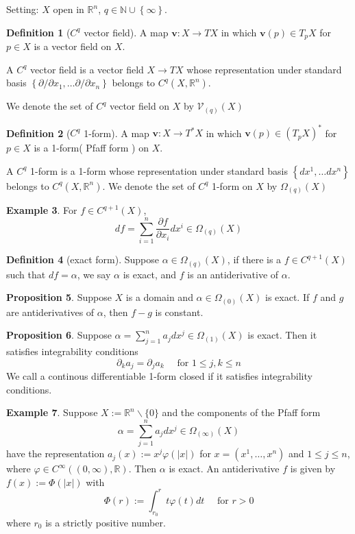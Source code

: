 \documentclass[12pt,a4paper]{book}
\newcommand{\bbrace}[1]{\left\{ #1 \right\} }
\newcommand{\bb}[1]{\mathbb{#1}}
\theoremstyle{definition}
\newtheorem{defn}{Definition}[section]
\newtheorem{prop}[defn]{Proposition}
\newtheorem{exam}[defn]{Example}
\begin{document}
Setting: $X$ open in $\bb{R}^n$, $q\in\bb{N}\cup\bbrace{\infty}$. 
\begin{defn}[$C^q$ vector field]
    A map $\boldsymbol{v}: X \rightarrow T X$ in which $\boldsymbol{v}(p) \in T_p X$ for $p \in X$ is a vector field on $X$.
    
    A $C^q$ vector field is a vector field $X\rightarrow TX$ whose
    representation under standard basis 
    $\bbrace{\partial/\partial x_1,\dots \partial/\partial x_n}$ 
    belongs to $C^q(X,\bb{R}^n)$. 

    We denote the set of $C^q$ vector field on $X$ by $\mathcal{V}_{(q)}(X)$

\end{defn}
\begin{defn}[$C^q$ 1-form]
    A map $\boldsymbol{v}: X \rightarrow T^* X$ in which 
    $\boldsymbol{v}(p) \in (T_pX)^* $ 
    for $p \in X$ is a 1-form( Pfaff form ) on $X$.
    
    A $C^q$ 1-form is a 1-form whose
    representation under standard basis 
    $\bbrace{dx^1,\dots dx^n}$ 
    belongs to $C^q(X,\bb{R}^n)$. 
    We denote the set of $C^q$ 1-form on $X$ by $\Omega_{(q)}(X)$

\end{defn}
\begin{exam}
    For $f\in C^{q+1}(X)$, 
    \begin{equation*}
        df=\sum_{i=1}^n \frac{\partial f}{\partial x_i} dx^i\in \Omega_{(q)}(X) 
    \end{equation*}
\end{exam}
\begin{defn}[exact form]
    Suppose $\alpha \in \Omega_{(q)}(X)$, 
    if there is a $f \in C^{q+1}(X)$ such that $d f=\alpha$, we say $\alpha$ is exact, and $f$ is an antiderivative of $\alpha$.    
\end{defn}
\begin{prop}
    Suppose $X$ is a domain and $\alpha \in \Omega_{(0)}(X)$ is exact. If $f$ and $g$ are antiderivatives of $\alpha$, then $f-g$ is constant.
\end{prop}
\begin{prop}
    Suppose $\alpha=\sum_{j=1}^n a_j d x^j \in \Omega_{(1)}(X)$ is exact. Then it satisfies integrability conditions
    $$
    \partial_k a_j=\partial_j a_k \quad \text { for } 1 \leq j, k \leq n
    $$
    We call a continous differentiable 1-form closed if it satisfies integrability conditions.
\end{prop}
\begin{exam}
    Suppose $X:=\mathbb{R}^n \backslash\{0\}$ and the components of the Pfaff form
    $$
    \alpha=\sum_{j=1}^n a_j d x^j \in \Omega_{(\infty)}(X)
    $$
    have the representation $a_j(x):=x^j \varphi(|x|)$ for $x=\left(x^1, \ldots, x^n\right)$ and $1 \leq j \leq n$, where $\varphi \in C^\infty((0, \infty), \mathbb{R})$. Then $\alpha$ is exact. An antiderivative $f$ is given by $f(x):=\Phi(|x|)$ with
    $$
    \Phi(r):=\int_{r_0}^r t \varphi(t) d t \quad \text { for } r>0
    $$
    where $r_0$ is a strictly positive number.
\end{exam}
\end{document}
